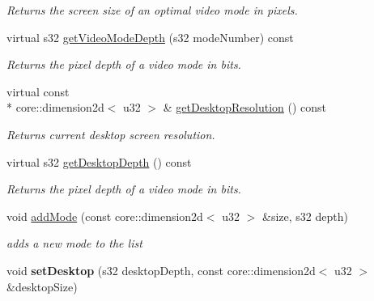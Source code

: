\begin{DoxyCompactItemize}
\begin{DoxyCompactList}\small\item\em Returns the screen size of an optimal video mode in pixels. \end{DoxyCompactList}\item 
\hypertarget{classirr_1_1video_1_1_c_video_mode_list_a8ed737a0f29c581f5247b5f3d0c2470c}{virtual s32 \hyperlink{classirr_1_1video_1_1_c_video_mode_list_a8ed737a0f29c581f5247b5f3d0c2470c}{get\-Video\-Mode\-Depth} (s32 mode\-Number) const }\label{classirr_1_1video_1_1_c_video_mode_list_a8ed737a0f29c581f5247b5f3d0c2470c}

\begin{DoxyCompactList}\small\item\em Returns the pixel depth of a video mode in bits. \end{DoxyCompactList}\item 
\hypertarget{classirr_1_1video_1_1_c_video_mode_list_a1294c24d4cb0e12da57ce9eb6cce9e3d}{virtual const \\*
core\-::dimension2d$<$ u32 $>$ \& \hyperlink{classirr_1_1video_1_1_c_video_mode_list_a1294c24d4cb0e12da57ce9eb6cce9e3d}{get\-Desktop\-Resolution} () const }\label{classirr_1_1video_1_1_c_video_mode_list_a1294c24d4cb0e12da57ce9eb6cce9e3d}

\begin{DoxyCompactList}\small\item\em Returns current desktop screen resolution. \end{DoxyCompactList}\item 
\hypertarget{classirr_1_1video_1_1_c_video_mode_list_ac23d30aaf9ed6f35abf43d849b8f6803}{virtual s32 \hyperlink{classirr_1_1video_1_1_c_video_mode_list_ac23d30aaf9ed6f35abf43d849b8f6803}{get\-Desktop\-Depth} () const }\label{classirr_1_1video_1_1_c_video_mode_list_ac23d30aaf9ed6f35abf43d849b8f6803}

\begin{DoxyCompactList}\small\item\em Returns the pixel depth of a video mode in bits. \end{DoxyCompactList}\item 
\hypertarget{classirr_1_1video_1_1_c_video_mode_list_ab13aad4971d2237fdf179f6c75a45258}{void \hyperlink{classirr_1_1video_1_1_c_video_mode_list_ab13aad4971d2237fdf179f6c75a45258}{add\-Mode} (const core\-::dimension2d$<$ u32 $>$ \&size, s32 depth)}\label{classirr_1_1video_1_1_c_video_mode_list_ab13aad4971d2237fdf179f6c75a45258}

\begin{DoxyCompactList}\small\item\em adds a new mode to the list \end{DoxyCompactList}\item 
\hypertarget{classirr_1_1video_1_1_c_video_mode_list_a8012615a2c6065b8eefdf58f17097427}{void {\bfseries set\-Desktop} (s32 desktop\-Depth, const core\-::dimension2d$<$ u32 $>$ \&desktop\-Size)}\label{classirr_1_1video_1_1_c_video_mode_list_a8012615a2c6065b8eefdf58f17097427}

\end{DoxyCompactItemize}


